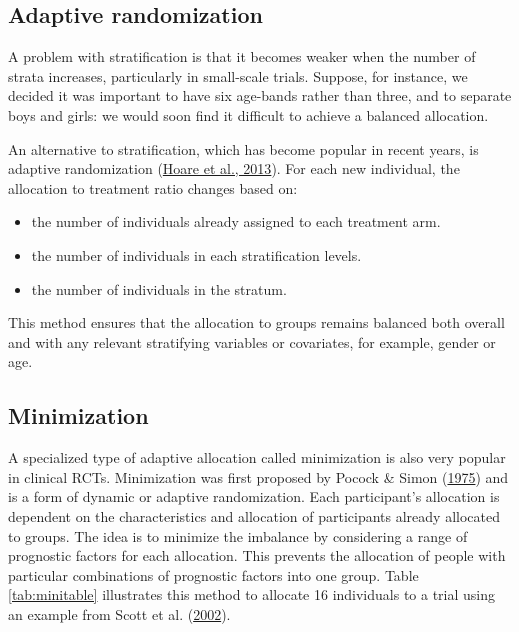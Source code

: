 \documentclass{krantz}
\providecommand{\tightlist}{%
\setlength{\itemsep}{0pt}\setlength{\parskip}{0pt}}
\begin{document}
\hypertarget{adaptive-randomization}{%
\subsection{Adaptive randomization}\label{adaptive-randomization}}

A problem with stratification is that it becomes weaker when the number of strata increases, particularly in small-scale trials. Suppose, for instance, we decided it was important to have six age-bands rather than three, and to separate boys and girls: we would soon find it difficult to achieve a balanced allocation.

An alternative to stratification, which has become popular in recent years, is adaptive randomization (\protect\hyperlink{ref-hoare2013}{Hoare et al., 2013}). For each new individual, the allocation to treatment ratio changes based on:

\begin{itemize}
\tightlist
\item
  the number of individuals already assigned to each treatment arm.
\item
  the number of individuals in each stratification levels.
\item
  the number of individuals in the stratum.
\end{itemize}

This method ensures that the allocation to groups remains balanced both overall and with any relevant stratifying variables or covariates, for example, gender or age.

\hypertarget{minimization}{%
\subsection{Minimization}\label{minimization}}

A specialized type of adaptive allocation called minimization is also very popular in clinical RCTs. Minimization was first proposed by Pocock \& Simon (\protect\hyperlink{ref-pocock1975}{1975}) and is a form of dynamic or adaptive randomization. Each participant's allocation is dependent on the characteristics and allocation of participants already allocated to groups. The idea is to minimize the imbalance by considering a range of prognostic factors for each allocation. This prevents the allocation of people with particular combinations of prognostic factors into one group. Table \ref{tab:minitable} illustrates this method to allocate 16 individuals to a trial using an example from Scott et al. (\protect\hyperlink{ref-scott2002}{2002}).
\end{document}
